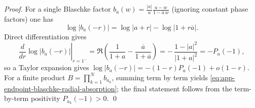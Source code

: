 \begin{proof}
For a single Blaschke factor \(b_a(w)=\frac{|a|}{a}\frac{a-w}{1-\overline a\,w}\) (ignoring constant phase factors) one has
\[
\log|b_a(-r)|
=\log|a+r|-\log|1+r\overline a|.
\]
Direct differentiation gives
\[
\left.\frac{d}{dr}\log|b_a(-r)|\right|_{r=1^-}
=\Re\!\left(\frac{1}{1+a}-\frac{\overline a}{1+\overline a}\right)
=-\,\frac{1-|a|^2}{|1+a|^2}
=-P_a(-1),
\]
so a Taylor expansion gives
\(
\log|b_a(-r)|=-(1-r)P_a(-1)+o(1-r)
\).
For a finite product \(B=\prod_{k=1}^{N}b_{a_k}\), summing term by term yields \eqref{eq:app-endpoint-blaschke-radial-absorption};
the final statement follows from the term-by-term positivity \(P_{a_k}(-1)>0\). \qed
\end{proof}
